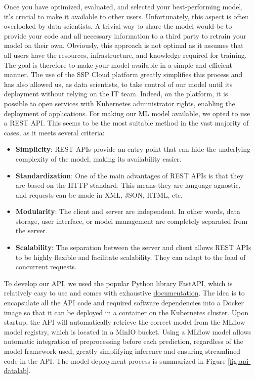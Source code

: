 
Once you have optimized, evaluated, and selected your best-performing model, it's crucial to make it available to other users. Unfortunately, this aspect is often overlooked by data scientists. A trivial way to share the model would be to provide your code and all necessary information to a third party to retrain your model on their own. Obviously, this approach is not optimal as it assumes that all users have the resources, infrastructure, and knowledge required for training. The goal is therefore to make your model available in a simple and efficient manner. The use of the SSP Cloud platform greatly simplifies this process and has also allowed us, as data scientists, to take control of our model until its deployment without relying on the IT team. Indeed, on the platform, it is possible to open services with Kubernetes administrator rights, enabling the deployment of applications. For making our ML model available, we opted to use a REST API. This seems to be the most suitable method in the vast majority of cases, as it meets several criteria:

\begin{itemize}
    \item \textbf{Simplicity}: REST APIs provide an entry point that can hide the underlying complexity of the model, making its availability easier.
    \item \textbf{Standardization}: One of the main advantages of REST APIs is that they are based on the HTTP standard. This means they are language-agnostic, and requests can be made in XML, JSON, HTML, etc.
    \item \textbf{Modularity}: The client and server are independent. In other words, data storage, user interface, or model management are completely separated from the server.
    \item \textbf{Scalability}: The separation between the server and client allows REST APIs to be highly flexible and facilitate scalability. They can adapt to the load of concurrent requests.
\end{itemize}

To develop our API, we used the popular Python library FastAPI, which is relatively easy to use and comes with exhaustive \href{https://fastapi.tiangolo.com/}{documentation}. The idea is to encapsulate all the API code and required software dependencies into a Docker image so that it can be deployed in a container on the Kubernetes cluster. Upon startup, the API will automatically retrieve the correct model from the MLflow model registry, which is located in a MinIO bucket. Using a MLflow model allows automatic integration of preprocessing before each prediction, regardless of the model framework used, greatly simplifying inference and ensuring streamlined code in the API. The model deployment process is summarized in Figure \ref{fig:api-datalab}.


